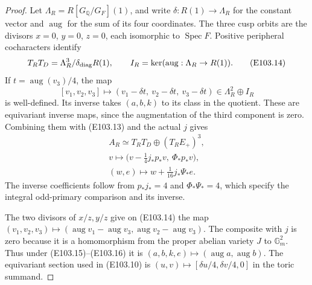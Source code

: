 \begin{proof}
Let $\Lambda_R=R[G_{\mathbb Q}/G_F](1)$, and write
$\delta:R(1)\to\Lambda_R$ for the constant vector and
$\operatorname{aug}$ for the sum of its four coordinates.
The three cusp orbits are the divisors $x=0$, $y=0$, $z=0$,
each isomorphic to $\operatorname{Spec}F$.  Positive peripheral
cocharacters identify
\[
 T_RT_D=\Lambda_R^3/\delta_{\rm diag}R(1),
 \qquad I_R=\ker(\operatorname{aug}:\Lambda_R\to R(1)).
 \tag{E103.14}
\]
If $t=\operatorname{aug}(v_3)/4$, the map
\[
 [v_1,v_2,v_3]\longmapsto
 (v_1-\delta t,\ v_2-\delta t,\ v_3-\delta t)
       \in\Lambda_R^2\oplus I_R
 \tag{E103.15}
\]
is well-defined.  Its inverse takes $(a,b,k)$ to its class in
the quotient.  These are equivariant inverse maps, since the
augmentation of the third component is zero.
Combining them with (E103.13) and the actual $j$ gives
\[
 \begin{gathered}
 A_R\simeq T_RT_D\oplus(T_RE_+)^3,\\
 v\longmapsto\bigl(v-\tfrac14j_*p_*v,\ \Phi_*p_*v\bigr),\\
 (w,e)\longmapsto w+\tfrac1{16}j_*\Psi_*e.
 \end{gathered}
 \tag{E103.16}
\]
The inverse coefficients follow from $p_*j_*=4$ and
$\Phi_*\Psi_*=4$, which specify the integral odd-primary comparison and its inverse.

The two divisors of $x/z,y/z$ give on (E103.14) the map
$(v_1,v_2,v_3)\mapsto
(\operatorname{aug}v_1-\operatorname{aug}v_3,
 \operatorname{aug}v_2-\operatorname{aug}v_3)$.
The composite with $j$ is zero because it is a homomorphism
from the proper abelian variety $J$ to $\mathbb G_m^2$.
Thus under (E103.15)--(E103.16) it is
$(a,b,k,e)\mapsto(\operatorname{aug}a,\operatorname{aug}b)$.
The equivariant section used in (E103.10) is
$(u,v)\mapsto[\delta u/4,\delta v/4,0]$ in the toric summand.


\end{proof}
